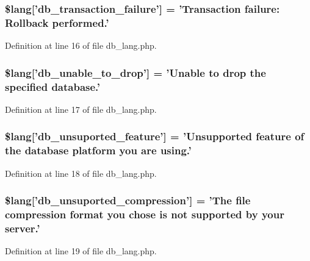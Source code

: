 \subsubsection[{\$lang}]{\setlength{\rightskip}{0pt plus 5cm}\$lang['db\-\_\-transaction\-\_\-failure'] = 'Transaction failure\-: Rollback performed.'}\label{db__lang_8php_a35f225a7ead01f13f8c6423b7c7433a0}


Definition at line 16 of file db\-\_\-lang.\-php.

\subsubsection[{\$lang}]{\setlength{\rightskip}{0pt plus 5cm}\$lang['db\-\_\-unable\-\_\-to\-\_\-drop'] = 'Unable {\bf to} drop the specified database.'}\label{db__lang_8php_af391f0d50d64cbb95cd733fa947fdb5e}


Definition at line 17 of file db\-\_\-lang.\-php.

\subsubsection[{\$lang}]{\setlength{\rightskip}{0pt plus 5cm}\$lang['db\-\_\-unsuported\-\_\-feature'] = 'Unsupported feature of the database platform you are using.'}\label{db__lang_8php_a2841b382e3764873e7e740523106d851}


Definition at line 18 of file db\-\_\-lang.\-php.

\subsubsection[{\$lang}]{\setlength{\rightskip}{0pt plus 5cm}\$lang['db\-\_\-unsuported\-\_\-compression'] = 'The file compression format you chose is {\bf not} supported by your server.'}\label{db__lang_8php_a89603fd8f05ad5569670542ebc15105b}


Definition at line 19 of file db\-\_\-lang.\-php.

